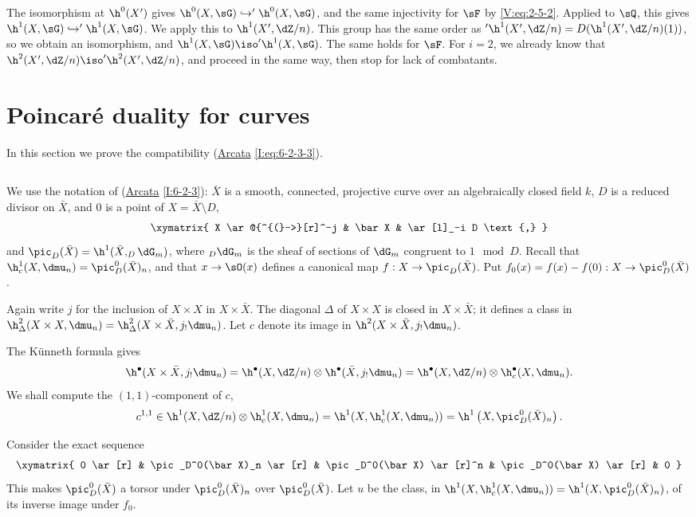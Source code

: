 \documentclass[oneside]{book}
\begin{document}
The isomorphism at $\h^0(X')$ gives
$\h^0(X,\sG)\hookrightarrow '\h^0(X,\sG)$, and the same injectivity for
$\sF$ by \eqref{V:eq:2-5-2}. Applied to $\sQ$, this gives
$\h^1(X,\sG)\hookrightarrow '\h^1(X,\sG)$. We apply this to
$\h^1(X',\dZ/n)$. This group has the same order as
$'\h^1(X',\dZ/n)=D(\h^1(X',\dZ/n)(1))$, so we obtain an isomorphism, and
$\h^1(X,\sG) \iso '\h^1(X,\sG)$. The same holds for $\sF$. For $i=2$, we
already know that $\h^2(X',\dZ/n) \iso '\h^2(X',\dZ/n)$, and proceed in the
same way, then stop for lack of combatants.


\section{Poincaré duality for curves}\label{V:3}

In this section we prove the compatibility
(\hyperref[I]{Arcata} \ref{I:eq:6-2-3-3}).


\subsection{}\label{V:3-1}

We use the notation of (\hyperref[I]{Arcata} \ref{I:6-2-3}): $\bar X$ is a
smooth, connected, projective curve over an algebraically closed field $k$,
$D$ is a reduced divisor on $\bar X$, and $0$ is a point of
$X=\bar X\setminus D$,
\[\xymatrix{
  X \ar@{^{(}->}[r]^-j
    & \bar X
    & \ar[l]_-i D \text{,}
}\]
and $\pic_D(\bar X)=\h^1(\bar X,_D\dG_m)$, where $_D\dG_m$ is the sheaf of
sections of $\dG_m$ congruent to $1\mod D$. Recall that
$\h_c^1(X,\dmu_n) = \pic_D^0(\bar X)_n$, and that $x\to \sO(x)$ defines a
canonical map $f:X\to \pic_D(\bar X)$. Put
$f_0(x)=f(x)-f(0):X\to \pic_D^0(\bar X)$.

Again write $j$ for the inclusion of $X\times X$ in $X\times \bar X$. The
diagonal $\Delta$ of $X\times X$ is closed in $X\times \bar X$; it defines a
class in
$\h_\Delta^2(X\times X,\dmu_n)=\h_\Delta^2(X\times \bar X,j_!\dmu_n)$. Let
$c$ denote its image in $\h^2(X\times \bar X,j_!\dmu_n)$.

The K\"unneth formula gives
\[
  \h^\bullet(X\times \bar X,j_!\dmu_n) = \h^\bullet(X,\dZ/n)\otimes \h^\bullet(\bar X,j_!\dmu_n) = \h^\bullet(X,\dZ/n)\otimes \h_c^\bullet(X,\dmu_n) \text{.}
\]
We shall compute the $(1,1)$-component of $c$,
\[
  c^{1,1} \in \h^1(X,\dZ/n)\otimes \h_c^1(X,\dmu_n) = \h^1(X,\h_c^1(X,\dmu_n)) = \h^1\left(X,\pic_D^0(\bar X)_n\right) \text{.}
\]

Consider the exact sequence
\[\xymatrix{
  0 \ar[r]
    & \pic_D^0(\bar X)_n \ar[r]
    & \pic_D^0(\bar X) \ar[r]^n
    & \pic_D^0(\bar X) \ar[r]
    & 0
}\]
This makes $\pic_D^0(\bar X)$ a torsor under $\pic_D^0(\bar X)_n$ over
$\pic_D^0(\bar X)$. Let $u$ be the class, in
$\h^1(X,\h_c^1(X,\dmu_n))=\h^1(X,\pic_D^0(\bar X)_n)$, of its inverse image
under $f_0$.
\end{document}

